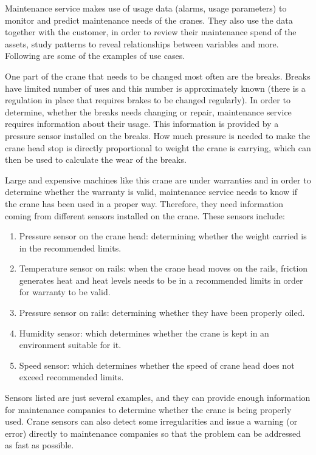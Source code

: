 Maintenance service makes use of usage data (alarms, usage parameters) to monitor and predict maintenance needs of the cranes. They also use the data together with the customer, in order to review their maintenance spend of the assets, study patterns to reveal relationships between variables and more. Following are some of the examples of use cases.

One part of the crane that needs to be changed most often are the breaks.
Breaks have limited number of uses and this number is approximately known
(there is a regulation in place that requires brakes to be changed regularly).
In order to determine, whether the breaks needs changing or repair, maintenance service requires information about their usage. This information is provided by a pressure sensor installed on the breaks. How much pressure is needed to make the crane head stop is directly proportional to weight the crane is carrying, which can then be used to calculate the wear of the breaks.

Large and expensive machines like this crane are under warranties and in order to determine whether the warranty is valid, maintenance service needs to know if the crane has been used in a proper way. Therefore, they need information coming from different sensors installed on the crane. These sensors include: 

\begin{enumerate}
	\setlength{\itemsep}{1pt}
	\item Pressure sensor on the crane head: determining whether the weight carried is in the recommended limits.  
	\item Temperature sensor on rails: when the crane head moves on the rails, friction generates heat and heat levels needs to be in a recommended limits in order for warranty to be valid.
	\item Pressure sensor on rails: determining whether they have been properly oiled.
	\item Humidity sensor: which determines whether the crane is kept in an environment suitable for it.
	\item Speed sensor: which determines whether the speed of crane head does not exceed recommended limits.
\end{enumerate}

Sensors listed are just several examples, and they can provide enough information for maintenance companies to determine whether the crane is being properly used. Crane sensors can also 
detect some irregularities and issue a warning (or error) directly to maintenance companies so that the problem can be addressed as fast as possible. 

